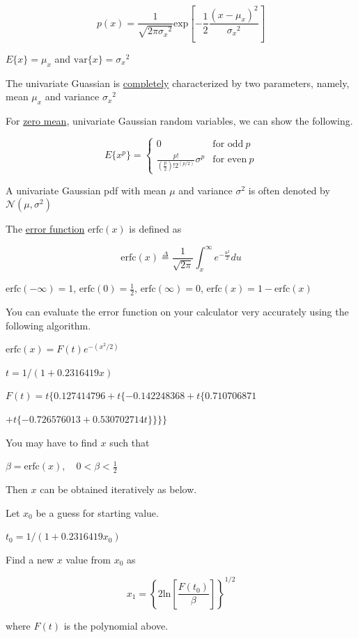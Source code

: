 \documentclass[fleqn]{article}
\begin{document}
\begin{enumerate}
		\begin{equation*}
			p(x) = \frac{1}{\sqrt{2\pi{\sigma_x}^2}}\text{exp}\left[-\frac{1}{2}\frac{(x-\mu_x)^2}{{\sigma_x}^2}\right]
		\end{equation*}
		
		$E\{x\} = \mu_x$ and $\text{var}\{x\} = {\sigma_x}^2$
		
		The univariate Guassian is \underline{completely} characterized by two parameters, namely, mean $\mu_x$ and variance ${\sigma_x}^2$
		
		For \underline{zero mean}, univariate Gaussian random variables, we can show the following.
		
		\begin{equation*}
			E\{x^p\} = \begin{cases}
				0 & \text{for odd}\ p\\
				\frac{p!}{\left(\frac{p}{2}\right)!2^{(p/2)}}\sigma^p & \text{for even}\ p
			\end{cases}
		\end{equation*}
			
		A univariate Gaussian pdf with mean $\mu$ and variance $\sigma^2$ is often denoted by $\mathcal{N}(\mu,\sigma^2)$
		
		The \underline{error function} $\text{erfc}(x)$ is defined as
		
		\begin{equation*}
			\text{erfc}(x) \overset{\Delta}{=} \frac{1}{\sqrt{2\pi}}\int_x^{\infty}{e^{-\frac{u^2}{2}}du}
		\end{equation*}
		
		$\text{erfc}(-\infty) = 1$, $\text{erfc}(0) = \frac{1}{2}$, $\text{erfc}(\infty) = 0$, $\text{erfc}(x) = 1 - \text{erfc}(x)$
		
		You can evaluate the error function on your calculator very accurately using the following algorithm.
		
		$\text{erfc}(x) = F(t)e^{-(x^2/2)}$
		
		$t = 1/(1 + 0.2316419x)$
		
		$F(t) = t\{0.127414796 + t\{-0.142248368 + t\{0.710706871$
		
		$+ t\{-0.726576013 + 0.530702714t\}\}\}\}$
		
		You may have to find $x$ such that
		
		$\beta = \text{erfc}(x),\quad 0 < \beta < \frac{1}{2}$
		
		Then $x$ can be obtained iteratively as below.
		
		Let $x_0$ be a guess for starting value.
		
		$t_0 = 1/(1 + 0.2316419x_0)$
		
		Find a new $x$ value from $x_0$ as
		
		\begin{equation*}
			x_1 = \left\{2\text{ln}\left[\frac{F(t_0)}{\beta}\right]\right\}^{1/2}
		\end{equation*}
		
		where $F(t)$ is the polynomial above.
	\end{enumerate}
\end{document}
